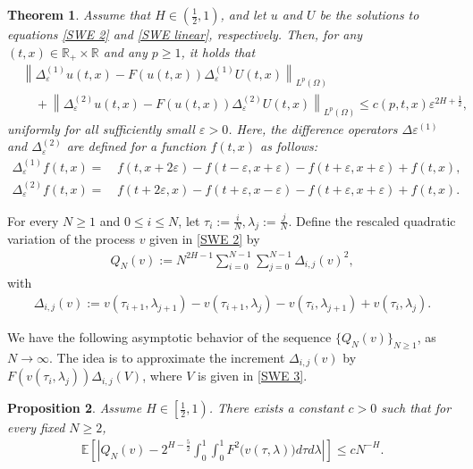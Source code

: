 \documentclass[11pt,reqno]{amsart}
\numberwithin{equation}{section}
\newtheorem{theorem}{Theorem}[section]
\newtheorem{proposition}[theorem]{Proposition}
\newcommand{\1}{{\bf 1}}
\newcommand{\2}{{\bf 2}}
\begin{document}
  \begin{theorem}\label{thm error 2} Assume that $H \in \left(\frac12, 1\right)$, and let $u$ and $U$ be the solutions to equations \eqref{SWE 2} and \eqref{SWE linear}, respectively. Then, for any $(t,x) \in \mathbb R_+ \times \mathbb R$ and any $p \ge 1$, it holds that
\begin{equation}\label{eq error 2}
\begin{split}
&\left\| \Delta_{\varepsilon}^{(1)} u(t, x) - F(u(t,x)) \Delta_{\varepsilon}^{(1)} U(t, x) \right\|_{L^p(\Omega)} \\
&\quad + \left\| \Delta_{\varepsilon}^{(2)} u(t, x) - F(u(t,x)) \Delta_{\varepsilon}^{(2)} U(t, x) \right\|_{L^p(\Omega)} \le c(p, t, x)   \varepsilon^{2H + \frac{1}{2}},
\end{split}
\end{equation}
uniformly for all sufficiently small $\varepsilon > 0$. Here, the difference operators $\Delta{\varepsilon}^{(1)}$ and $\Delta_{\varepsilon}^{(2)}$ are defined for a function $f(t, x)$ as follows:
\begin{align*}
\Delta_{\varepsilon}^{(1)}f(t,x)=&\, f(t,x+2\varepsilon)-f(t-\varepsilon, x+\varepsilon)-f(t+\varepsilon, x+\varepsilon)+f(t,x),\\
\Delta_{\varepsilon}^{(2)}f(t,x)=&\, f(t+2\varepsilon, x)-f(t+\varepsilon, x-\varepsilon)-f(t+\varepsilon, x+\varepsilon)+f(t,x).
\end{align*} 
\end{theorem} 
    
     
       For every $N\ge1$ and $0\le i\le N$, let
   $\tau_i:=\frac{i}{N}, \lambda_j:=\frac{j}{N}$.   Define the rescaled quadratic  variation of   the process $v$ given in \eqref{SWE 2}  by 
  \begin{align}\label{eq V v}
Q_{N}(v):= N^{2H-1}\sum_{i=0}^{N-1}\sum_{j=0}^{N-1}\Delta_{i,j}(v)^2,
\end{align} 
with
\begin{align}\label{eq V ij}
\Delta_{i,j}(v)  := v\left(\tau_{i+1}, \lambda_{j+1}  \right)-v\left(\tau_{i+1}, \lambda_{j}\right)-v\left(\tau_{i}, \lambda_{j+1}  \right) +v\left(\tau_{i}, \lambda_{j}    \right).
\end{align}


 We have  the following asymptotic behavior of the sequence $\{Q_{N}(v)\}_{ N\ge 1}$, as $N\rightarrow\infty$.
  The idea is to approximate the increment $\Delta_{i,j}(v)$  by $F(v(\tau_i, \lambda_j))\Delta_{i,j}(V)$, where $V$ is given in \eqref{SWE 3}.   
    \begin{proposition}\label{prop variation converge}  
  Assume $H\in \left[\frac12, 1\right)$. There exists a constant $c>0$ such that  for every  fixed   $N\ge 2$, 
  \begin{align}\label{eq quad}
  \mathbb E\left[\left| Q_{N}(v)-  2^{H-\frac{5}{2}} \int_0^1\int_0^1 F^2\big(v(\tau, \lambda) \big) d\tau d\lambda \right|  \right]\le c N^{- H}.
  \end{align} 
   \end{proposition}
   
\end{document}
